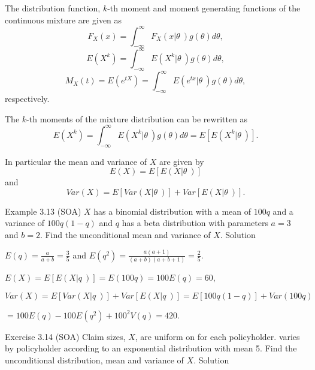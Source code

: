 \documentclass[]{book}
\begin{document}
The distribution function, \(k\)-th moment and moment generating
functions of the continuous mixture are given as
\[F_{X}\left( x \right) = \int_{-\infty}^{\infty}{F_{X}\left( x\left| \theta \right.\  \right)g\left( \theta \right)} d \theta,\]
\[E\left( X^{k} \right) = \int_{-\infty}^{\infty}{E\left( X^{k}\left| \theta \right.\  \right)g\left( \theta \right)}d \theta,\]
\[M_{X}\left( t \right) = E\left( e^{t X} \right) = \int_{-\infty}^{\infty}{E\left( e^{ tx}\left| \theta \right.\  \right)g\left( \theta \right)}d \theta, \]
respectively.

The \(k\)-th moments of the mixture distribution can be rewritten as
\[E\left( X^{k} \right) = \int_{-\infty}^{\infty}{E\left( X^{k}\left| \theta \right.\  \right)g\left( \theta \right)}d\theta = E\left\lbrack E\left( X^{k}\left| \theta \right.\  \right) \right\rbrack .\]

In particular the mean and variance of \(X\) are given by
\[E\left( X \right) = E\left\lbrack E\left( X\left| \theta \right.\  \right) \right\rbrack\]
and
\[Var\left( X \right) = E\left\lbrack Var\left( X\left| \theta \right.\  \right) \right\rbrack + Var\left\lbrack E\left( X\left| \theta \right.\  \right) \right\rbrack .\]

Example 3.13 (SOA) \(X\) has a binomial distribution with a mean of
\(100q\) and a variance of \(100q\left( 1 - q \right)\) and \(q\) has a
beta distribution with parameters \(a = 3\) and \(b = 2\). Find the
unconditional mean and variance of \(X\). Solution

\(E\left( q \right) = \frac{a}{a + b} = \frac{3}{5}\) and
\(E\left( q^{2} \right) = \frac{a\left( a + 1 \right)}{\left( a + b \right)\left( a + b + 1 \right)} = \frac{2}{5}\).

\(E\left( X \right) = E\left\lbrack E\left( X\left| q \right.\  \right) \right\rbrack = E\left( 100q \right) = 100E\left( q \right) = 60\),

\[Var\left( X \right) = E\left\lbrack Var\left( X\left| q \right.\  \right) \right\rbrack + Var\left\lbrack E\left( X\left| q \right.\  \right) \right\rbrack = E\left\lbrack 100q\left( 1 - q \right) \right\rbrack + Var\left( 100q \right)\]

\(= 100E\left( q \right) - 100E\left( q^{2} \right) + 100^{2}V\left( q \right) = 420\).

Exercise 3.14 (SOA) Claim sizes, \(X\), are uniform on for each
policyholder. varies by policyholder according to an exponential
distribution with mean 5. Find the unconditional distribution, mean and
variance of \(X\). Solution
\end{document}
